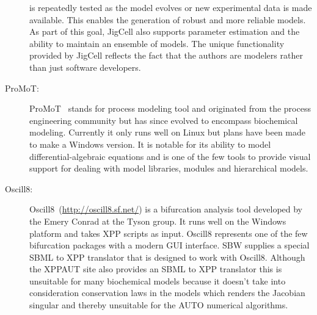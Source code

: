 \documentclass[12pt]{article}
\begin{document}
\begin{description}
is repeatedly tested as the model evolves or new
experimental data is made available. This enables the generation of
robust and more reliable models. As part of this goal, JigCell also
supports parameter estimation and the ability to maintain an
ensemble of models. The unique functionality provided by JigCell reflects the
fact that the authors are modelers rather than just software developers.
%
\item[ProMoT:] ProMoT~\citep{Ginkel:2003} stands for process modeling tool and
originated from the process engineering community but has since
evolved to encompass biochemical modeling. Currently it only runs
well on Linux but plans have been made to make a Windows version. It
is notable for its ability to model differential-algebraic equations
and is one of the few tools to provide visual support for dealing
with model libraries, modules and hierarchical models.
%
\item[Oscill8:] Oscill8~(\url{http://oscill8.sf.net/}) is a
bifurcation analysis tool developed by the Emery Conrad at the Tyson
group. It runs well on the Windows platform and takes XPP scripts as
input. Oscill8 represents one of the few bifurcation packages with a
modern GUI interface. SBW supplies a special SBML to XPP translator
that is designed to work with Oscill8. Although the XPPAUT site also
provides an SBML to XPP translator this is unsuitable for many
biochemical models because it doesn't take into consideration
conservation laws in the models which renders the Jacobian singular
and thereby unsuitable for the AUTO numerical algorithms.


\end{description}
\end{document}
